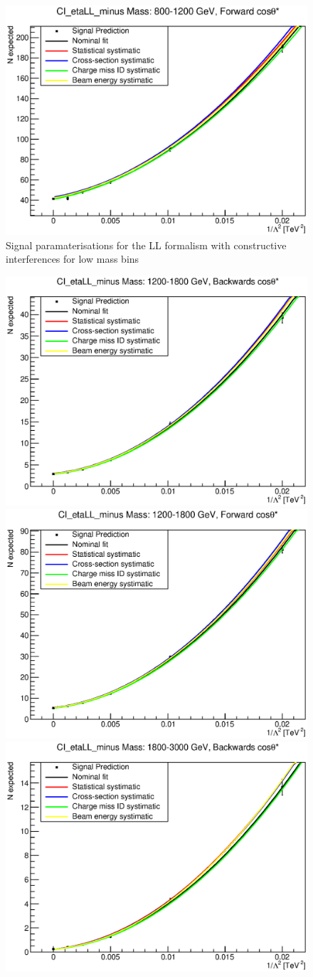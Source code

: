 \begin{figure}[ht]
			\includegraphics[width=0.49\linewidth]{images/thesis_fits/CI_2D_etaLL_minus_Mass_800-1200_GeV_CTS_0_1.eps}
		\caption{Signal paramaterisations for the LL formalism with constructive interferences for low mass bins}
		\label{fig:parm_LL_m_1}
	\end{figure}

	\begin{figure}[ht]
		\centering
			\includegraphics[width=0.49\linewidth]{images/thesis_fits/CI_2D_etaLL_minus_Mass_1200-1800_GeV_CTS_-1_0.eps}
			\includegraphics[width=0.49\linewidth]{images/thesis_fits/CI_2D_etaLL_minus_Mass_1200-1800_GeV_CTS_0_1.eps}
			\includegraphics[width=0.49\linewidth]{images/thesis_fits/CI_2D_etaLL_minus_Mass_1800-3000_GeV_CTS_-1_0.eps}

\end{figure}
